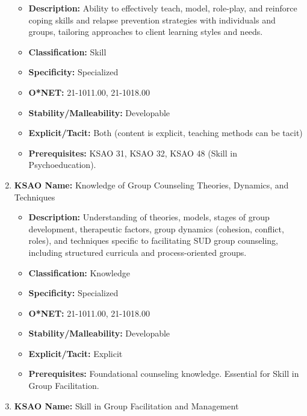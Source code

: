 \documentclass[
  letterpaper,
  DIV=11,
  numbers=noendperiod]{scrartcl}
\providecommand{\tightlist}{%
  \setlength{\itemsep}{0pt}\setlength{\parskip}{0pt}}
\begin{document}
\begin{enumerate}
  \begin{itemize}
  \tightlist
  \item
    \textbf{Description:} Ability to effectively teach, model,
    role-play, and reinforce coping skills and relapse prevention
    strategies with individuals and groups, tailoring approaches to
    client learning styles and needs.
  \item
    \textbf{Classification:} Skill
  \item
    \textbf{Specificity:} Specialized
  \item
    \textbf{O*NET:} 21-1011.00, 21-1018.00
  \item
    \textbf{Stability/Malleability:} Developable
  \item
    \textbf{Explicit/Tacit:} Both (content is explicit, teaching methods
    can be tacit)
  \item
    \textbf{Prerequisites:} KSAO 31, KSAO 32, KSAO 48 (Skill in
    Psychoeducation).
  \end{itemize}
\item
  \textbf{KSAO Name:} Knowledge of Group Counseling Theories, Dynamics,
  and Techniques

  \begin{itemize}
  \tightlist
  \item
    \textbf{Description:} Understanding of theories, models, stages of
    group development, therapeutic factors, group dynamics (cohesion,
    conflict, roles), and techniques specific to facilitating SUD group
    counseling, including structured curricula and process-oriented
    groups.
  \item
    \textbf{Classification:} Knowledge
  \item
    \textbf{Specificity:} Specialized
  \item
    \textbf{O*NET:} 21-1011.00, 21-1018.00
  \item
    \textbf{Stability/Malleability:} Developable
  \item
    \textbf{Explicit/Tacit:} Explicit
  \item
    \textbf{Prerequisites:} Foundational counseling knowledge. Essential
    for Skill in Group Facilitation.
  \end{itemize}
\item
  \textbf{KSAO Name:} Skill in Group Facilitation and Management


\end{enumerate}
\end{document}
